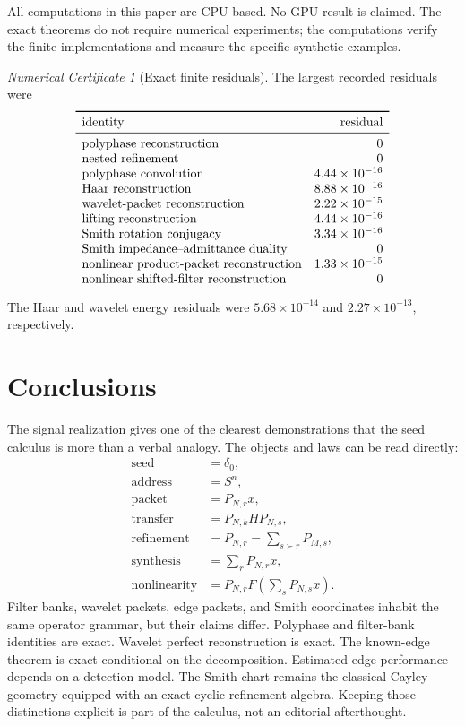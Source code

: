 \documentclass[11pt]{article}
\theoremstyle{definition}
\theoremstyle{remark}
\newtheorem{certificate}[theorem]{Numerical Certificate}
\begin{document}
All computations in this paper are CPU-based. No GPU result is claimed. The exact theorems do not require numerical experiments; the computations verify the finite implementations and measure the specific synthetic examples.

\begin{certificate}[Exact finite residuals]
The largest recorded residuals were
\[
\begin{array}{lr}
\toprule
\text{identity}&\text{residual}\\
\midrule
\text{polyphase reconstruction}&0\\
\text{nested refinement}&0\\
\text{polyphase convolution}&4.44\times10^{-16}\\
\text{Haar reconstruction}&8.88\times10^{-16}\\
\text{wavelet-packet reconstruction}&2.22\times10^{-15}\\
\text{lifting reconstruction}&4.44\times10^{-16}\\
\text{Smith rotation conjugacy}&3.34\times10^{-16}\\
\text{Smith impedance--admittance duality}&0\\
\text{nonlinear product-packet reconstruction}&1.33\times10^{-15}\\
\text{nonlinear shifted-filter reconstruction}&0\\
\bottomrule
\end{array}
\]
The Haar and wavelet energy residuals were $5.68\times10^{-14}$ and $2.27\times10^{-13}$, respectively.
\end{certificate}

\section{Conclusions}

The signal realization gives one of the clearest demonstrations that the seed calculus is more than a verbal analogy. The objects and laws can be read directly:
\[
\boxed{
\begin{aligned}
\text{seed}&=\delta_0,\\
\text{address}&=S^n,\\
\text{packet}&=P_{N,r}x,\\
\text{transfer}&=P_{N,k}HP_{N,s},\\
\text{refinement}&=P_{N,r}=\sum_{s\succ r}P_{M,s},\\
\text{synthesis}&=\sum_rP_{N,r}x,\\
\text{nonlinearity}&=P_{N,r}F\left(\sum_sP_{N,s}x\right).
\end{aligned}
}
\]
Filter banks, wavelet packets, edge packets, and Smith coordinates inhabit the same operator grammar, but their claims differ. Polyphase and filter-bank identities are exact. Wavelet perfect reconstruction is exact. The known-edge theorem is exact conditional on the decomposition. Estimated-edge performance depends on a detection model. The Smith chart remains the classical Cayley geometry equipped with an exact cyclic refinement algebra. Keeping those distinctions explicit is part of the calculus, not an editorial afterthought.
\end{document}
